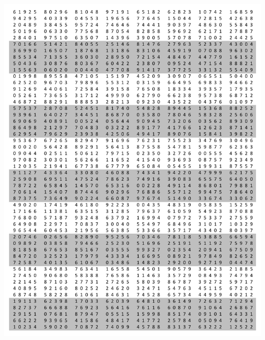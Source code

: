 \documentclass{article}
\begin{document}
\vfill
\pagebreak

\includegraphics[scale=0.7]{RandNumbers.pdf}
\end{document}
